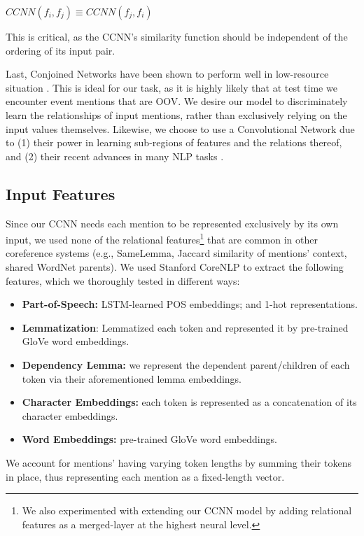 \documentclass[11pt,a4paper]{article}
\begin{document}
$CCNN(f_i,f_j) \equiv CCNN(f_j,f_i)$

This is critical, as the CCNN's similarity function should be independent of the ordering of its input pair.

Last, Conjoined Networks have been shown to perform well in low-resource situation \cite{Koch2015SiameseNN}.  This is ideal for our task, as it is highly likely that at test time we encounter event mentions that are OOV.  We desire our model to discriminately learn the relationships of input mentions, rather than exclusively relying on the input values themselves.  Likewise, we choose to use a Convolutional Network due to (1) their power in learning sub-regions of features and the relations thereof, and (2) their recent advances in many NLP tasks \cite{DBLP:conf/emnlp/Kim14,DBLP:conf/acl/GehringAGD17,DBLP:journals/corr/YuV17}.

\subsection{Input Features}
\label{sec:features}
Since our CCNN needs each mention to be represented exclusively by its own input, we used none of the relational features\footnote{We also experimented with extending our CCNN model by adding relational features as a merged-layer at the highest neural level.} that are common in other coreference systems (e.g., SameLemma, Jaccard similarity of mentions' context, shared WordNet parents).  We used Stanford CoreNLP \cite{manning-EtAl:2014:P14-5} to extract the following features, which we thoroughly tested in different ways: %
\begin{itemize}
  \item \textbf{Part-of-Speech:} LSTM-learned POS embeddings; and 1-hot representations.
  \item \textbf{Lemmatization}: Lemmatized each token and represented it by pre-trained GloVe \cite{pennington2014glove} word embeddings.
  \item \textbf{Dependency Lemma:} we represent the dependent parent/children of each token via their aforementioned lemma embeddings.
  \item \textbf{Character Embeddings:} each token is represented as a concatenation of its character embeddings.
  \item \textbf{Word Embeddings:} pre-trained GloVe word embeddings.
\end{itemize}
We account for mentions' having varying token lengths by summing their tokens in place, thus representing each mention as a fixed-length vector.
\end{document}
